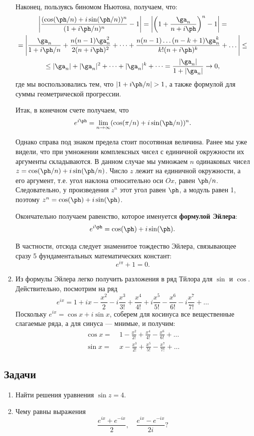\begin{enumerate}
Наконец, пользуясь биномом Ньютона, получаем, что:
\begin{gather*}
\left|\frac{(\cos(\ph/n)+i\sin(\ph/n))^n}{(1+i\ph/n)^n}-1\right| = \left|\left(1+\frac{\ga_n}{n+i\ph}\right)^n-1\right| = \\
= \left|\frac{\ga_n}{1+i\ph/n} + \frac{n(n-1)\ga_n^2}{2(n+i\ph)^2} + \dots + 
\frac{n(n-1)\dots(n-k+1)\ga_n^k}{k!(n+i\ph)^k} + \dots \right| \le \\
\le |\ga_n| + |\ga_n|^2 + \dots + |\ga_n|^k + \dots = \frac{|\ga_n|}{1+|\ga_n|} \to 0,
\end{gather*}
где мы воспользовались тем, что $|1+i\ph/n|>1$, а также формулой для суммы геометрической прогрессии.

Итак, в конечном счете получаем, что
$$
e^{i\ph} = \lim_{n\to\infty}(\cos(\pi/n)+i\sin(\ph/n))^n.
$$

Однако справа под знаком предела стоит посотянная величина. Ранее мы уже видели, что при умножении комплексных чисел с единичной окружности их аргументы складываются. В данном случае мы умножаем $n$ одинаковых чисел $z=\cos(\ph/n)+i\sin(\ph/n)$. Число $z$ лежит на единичной окружности, а его аргумент, т.е. угол наклона относительно оси $Ox$, равен $\ph/n$. Следовательно, у произведения $z^n$ этот угол равен $\ph$, а модуль равен 1, поэтому $z^n=\cos(\ph)+i\sin(\ph)$.

Окончательно получаем равенство, которое именуется \textbf{формулой Эйлера}:
$$
e^{i\ph} = \cos(\ph)+i\sin(\ph).
$$

В частности, отсюда следует знаменитое тождество Эйлера, связывающее сразу 5 фундаментальных математических констант:
$$
e^{i\pi}+1=0.
$$

\item Из формулы Эйлера легко получить разложения в ряд Тйлора для $\sin$ и $\cos$. Действительно, посмотрим на ряд
$$
e^{ix} = 1 + ix - \frac{x^2}{2} - i\frac{x^3}{3!} + \frac{x^4}{4!} + i\frac{x^5}{5!} - \frac{x^6}{6!} - i\frac{x^7}{7!}+\dots
$$
Поскольку $e^{ix}=\cos x+i\sin x$, соберем для косинуса все вещественные слагаемые ряда, а для синуса --- мнимые, и получим:
\begin{align*}
\cos x = & \;1 - \frac{x^2}{2!} + \frac{x^4}{4!} - \frac{x^6}{6!} + \dots \\
\sin x = &\; x - \frac{x^3}{2!} + \frac{x^5}{5!} - \frac{x^7}{7!} + \dots
\end{align*}
\end{enumerate}



\subsection*{Задачи}
\begin{enumerate}
\item Найти решения уравнения $\sin z=4$.
\item Чему равны выражения
$$
\frac{e^{ix}+e^{-ix}}{2},\quad \frac{e^{ix}-e^{-ix}}{2i}?
$$
\end{enumerate}




